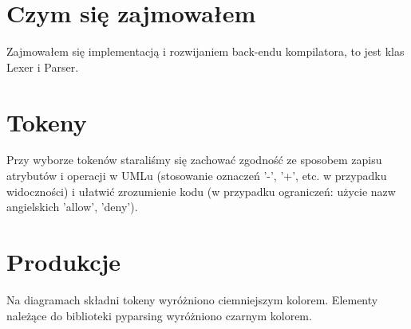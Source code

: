 \section{Czym się zajmowałem}
Zajmowałem się implementacją i rozwijaniem back-endu kompilatora, to jest klas Lexer i Parser.

\section{Tokeny}
Przy wyborze tokenów staraliśmy się zachować zgodność ze sposobem zapisu atrybutów i operacji w UMLu (stosowanie oznaczeń '-', '+', etc. w przypadku widoczności) i ułatwić zrozumienie kodu (w przypadku ograniczeń: użycie nazw angielskich 'allow', 'deny').


\section{Produkcje}
Na diagramach składni tokeny wyróżniono ciemniejszym kolorem. Elementy należące do biblioteki pyparsing wyróżniono czarnym kolorem.


